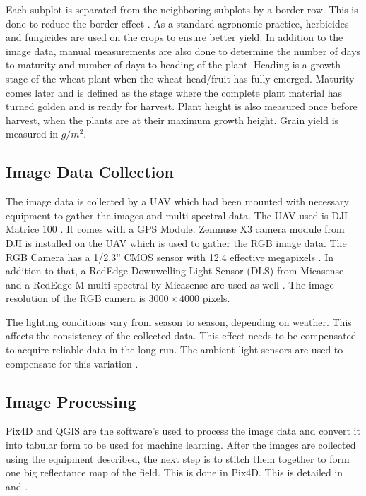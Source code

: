 \documentclass[sigconf, nonacm, natbib, screen, balance=False]{acmart}
\begin{document}
Each subplot is separated from the neighboring subplots by a border row. This is done to reduce the border effect \citep{May1986EFFECTOD, WANG20171}. As a standard agronomic practice, herbicides and fungicides are used on the crops to ensure better yield. In addition to the image data, manual measurements are also done to determine the number of days to maturity and number of days to heading of the plant. Heading is a growth stage of the wheat plant when the wheat head/fruit has fully emerged\citep{White2008}. Maturity comes later and is defined as the stage where the complete plant material has turned golden and is ready for harvest\citep{Hanft1982}. Plant height is also measured once before harvest, when the plants are at their maximum growth height. Grain yield is measured in $g/m^2$.

\subsection{Image Data Collection}\label{sec:data_collection}

The image data is collected by a UAV which had been mounted with necessary equipment to gather the images and multi-spectral data. The UAV used is DJI Matrice 100 \citep{Matrice171:online}. It comes with a GPS Module. Zenmuse X3 camera module from DJI is installed on the UAV which is used to gather the RGB image data. The RGB Camera has a 1/2.3” CMOS sensor with 12.4 effective megapixels \citep{ZenmuseX77:online}. In addition to that, a RedEdge Downwelling Light Sensor (DLS) \citep{light_sensors:online} from Micasense and a RedEdge-M multi-spectral by Micasense \citep{RedEdgeM:online} are used as well \citep{lied}. The image resolution of the RGB camera is $3000 \times 4000$ pixels.

The lighting conditions vary from season to season, depending on weather. This affects the consistency of the collected data. This effect needs to be compensated to acquire reliable data in the long run. The ambient light sensors are used to compensate for this variation \citep{Bestpractices_mica:online}.

\subsection{Image Processing}\label{sec:image_proc}

Pix4D and QGIS are the software's used to process the image data and convert it into tabular form to be used for machine learning. After the images are collected using the equipment described, the next step is to stitch them together to form one big reflectance map of the field. This is done in Pix4D. This is detailed in \citet{lied} and \citet{grindbakken}.
\end{document}
